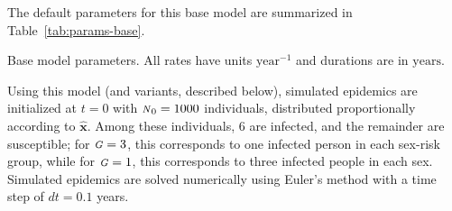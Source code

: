 \documentclass[10pt]{article}
\numberwithin{equation}{section}
\newcommand{\N}{{\mbox{\footnotesize{\textit{N}}}}}
\newcommand{\G}{{\mbox{\footnotesize{\textit{G}}}}}
\newcommand{\tab}[1]{Table~\ref{#1}}
\begin{document}
The default parameters for this base model are summarized in
\tab{tab:params-base}.
\begin{table}[b]
  \centering\caption{Base model parameters. All rates have units $\mathrm{year}^{-1}$ and durations are in $\mathrm{years}$.}
  \label{tab:params-base}
  
\end{table}
\par
Using this model (and variants, described below),
simulated epidemics are initialized at $t = 0$ with $\N_0 = 1000$ individuals,
distributed proportionally according to $\bm{\hat{x}}$.
Among these individuals, 6 are infected, and the remainder are susceptible;
for $\G = 3$, this corresponds to one infected person in each sex-risk group,
while for $\G = 1$, this corresponds to three infected people in each sex.
Simulated epidemics are solved numerically using Euler's method
with a time step of $dt = 0.1$ years.
\end{document}
